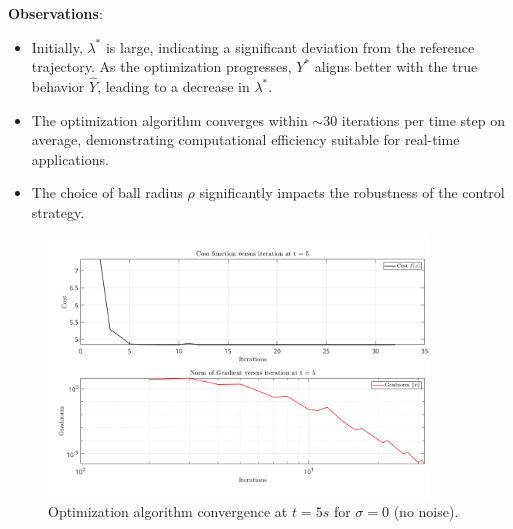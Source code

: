 \textbf{Observations}:
\begin{itemize}
    \item Initially, $\lambda^*$ is large, indicating a significant deviation from the reference trajectory. As the optimization progresses, $Y^*$ aligns better with the true behavior $\hat{Y}$, leading to a decrease in $\lambda^*$.
    \item The optimization algorithm converges within $\sim 30$ iterations per time step on average, demonstrating computational efficiency suitable for real-time applications.
    \item The choice of ball radius $\rho$ significantly impacts the robustness of the control strategy.
\end{itemize}
\begin{figure}[h!]
    \centering
    \includegraphics[width=0.9\textwidth]{figures/cost_gradnorm_noiseless_gamma_5_rho_0p1.png}
    \caption{Optimization algorithm convergence at $t=5s$ for $\sigma = 0$ (no noise).}
    \label{fig:conv_noiseless}
\end{figure}

